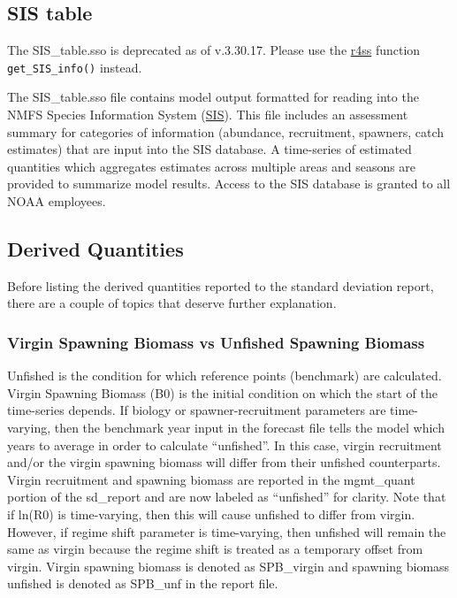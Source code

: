 \subsection{SIS table}
The SIS\_table.sso is deprecated as of v.3.30.17. Please use the \hyperref[sec:r4ss]{r4ss} function \texttt{get\_SIS\_info()} instead. 

The SIS\_table.sso file contains model output formatted for reading into the NMFS Species Information System (\href{https://www.st.nmfs.noaa.gov/sis/}{SIS}). This file includes an assessment summary for categories of information (abundance, recruitment, spawners, catch estimates) that are input into the SIS database. A time-series of estimated quantities which aggregates estimates across multiple areas and seasons are provided to summarize model results. Access to the SIS database is granted to all NOAA employees.

\subsection{Derived Quantities}
Before listing the derived quantities reported to the standard deviation report, there are a couple of topics that deserve further explanation.

\hypertarget{VirginUnfished}{}
\subsubsection{Virgin Spawning Biomass vs Unfished Spawning Biomass}
Unfished is the condition for which reference points (benchmark) are calculated. Virgin Spawning Biomass (B0) is the initial condition on which the start of the time-series depends. If biology or spawner-recruitment parameters are time-varying, then the benchmark year input in the forecast file tells the model which years to average in order to calculate ``unfished''. In this case, virgin recruitment and/or the virgin spawning biomass will differ from their unfished counterparts. Virgin recruitment and spawning biomass are reported in the mgmt\_quant portion of the sd\_report and are now labeled as ``unfished'' for clarity. Note that if ln(R0) is time-varying, then this will cause unfished to differ from virgin. However, if regime shift parameter is time-varying, then unfished will remain the same as virgin because the regime shift is treated as a temporary offset from virgin. Virgin spawning biomass is denoted as SPB\_virgin and spawning biomass unfished is denoted as SPB\_unf in the report file.

